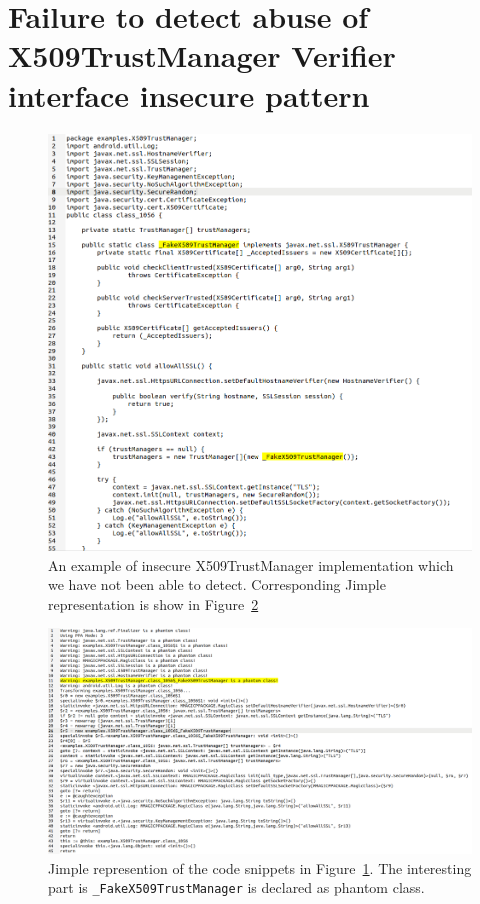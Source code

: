 \section{Failure to detect abuse of X509TrustManager Verifier interface insecure pattern}
\label{appendix:X509TrustManager}
\begin{figure}[t]
\includegraphics[width=\linewidth]{Figures/Java_TrustManager.png}
\caption{An example of insecure X509TrustManager implementation which we have not been able to detect. 
Corresponding Jimple representation is show in Figure~\ref{fig:trustmanager-jimple} }
\label{fig:trustmanager}
\end{figure}

\label{appendix:X509TrustManager}
\begin{figure}[t]
\includegraphics[width=\linewidth]{Figures/Jimple_TrustManager.png}
\caption{Jimple represention of the code snippets in Figure~\ref{fig:trustmanager}. The interesting part is \texttt{\_FakeX509TrustManager} is declared as phantom class.}
\label{fig:trustmanager-jimple}
\end{figure}

